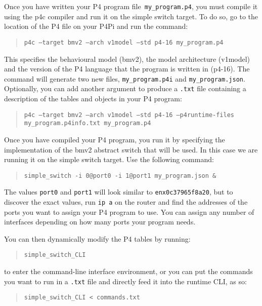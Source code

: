 



Once you have written your P4 program file\texttt{ my\_program.p4}, you must compile it using the p4c compiler and run it on the simple switch target. To do so, go to the location of the P4 file on your P4Pi and run the command:

\begin{quote}
    \texttt{p4c --target bmv2 --arch v1model --std p4-16 my\_program.p4}
\end{quote}

This specifies the behavioural model (bmv2), the model architecture (v1model) and the version of the P4 language that the program is written in (p4-16). The command will generate two new files, \texttt{my\_program.p4i} and \texttt{my\_program.json}. Optionally, you can add another argument to produce a \texttt{.txt} file containing a description of the tables and objects in your P4 program:

\begin{quote}
    \texttt{p4c --target bmv2 --arch v1model --std p4-16 --p4runtime-files my\_program.p4info.txt my\_program.p4}
\end{quote}

Once you have compiled your P4 program, you run it by specifying the implementation of the bmv2 abstract switch that will be used. In this case we are running it on the simple switch target. Use the following command:

\begin{quote} 
    \texttt{simple\_switch -i 0@port0 -i 1@port1 my\_program.json \&}
\end{quote}

The values \texttt{port0} and \texttt{port1} will look similar to \texttt{enx0c37965f8a20}, but to discover the exact values, run \texttt{ip a} on the router and find the addresses of the ports you want to assign your P4 program to use. You can assign any number of interfaces depending on how many ports your program needs.

You can then dynamically modify the P4 tables by running:
\begin{quote}
    \texttt{simple\_switch\_CLI}
\end{quote}
to enter the command-line interface environment, or you can put the commands you want to run in a \texttt{.txt} file and directly feed it into the runtime CLI, as so:
\begin{quote}
    \texttt{simple\_switch\_CLI < commands.txt}
\end{quote}
